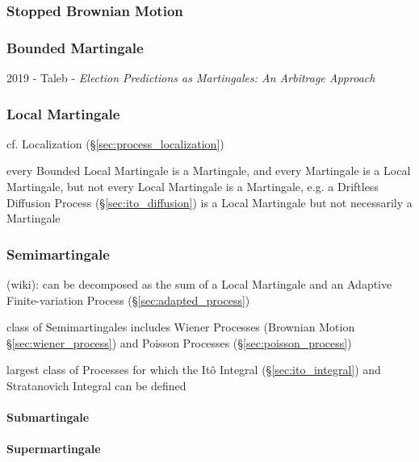 \subsubsection{Stopped Brownian Motion}\label{sec:stopped_brownian_motion}

\subsubsection{Bounded Martingale}\label{sec:bounded_martingale}

2019 - Taleb - \emph{Election Predictions as Martingales: An Arbitrage Approach}



\subsubsection{Local Martingale}\label{sec:local_martingale}

cf. Localization (\S\ref{sec:process_localization})

every Bounded Local Martingale is a Martingale, and every Martingale is a Local
Martingale, but not every Local Martingale is a Martingale, e.g. a Driftless
Diffusion Process (\S\ref{sec:ito_diffusion}) is a Local Martingale but not
necessarily a Martingale



\subsubsection{Semimartingale}\label{sec:semimartingale}

(wiki): can be decomposed as the sum of a Local Martingale and an Adaptive
Finite-variation Process (\S\ref{sec:adapted_process})

class of Semimartingales includes Wiener Processes (Brownian Motion
\S\ref{sec:wiener_process}) and Poisson Processes
(\S\ref{sec:poisson_process})

largest class of Processes for which the It\^o Integral
(\S\ref{sec:ito_integral}) and Stratanovich Integral can be defined



\paragraph{Submartingale}\label{sec:submartingale}\hfill

\paragraph{Supermartingale}\label{sec:supermartingale}\hfill


